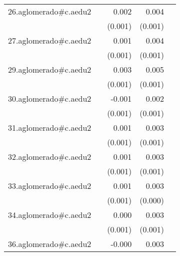 {\begin{longtable}{l*{4}{D{.}{.}{-1}}}
\addlinespace
26.aglomerado#c.aedu2&                     &       0.002         &       0.004\sym{***}&                     \\
            &                     &     (0.001)         &     (0.001)         &                     \\
\addlinespace
27.aglomerado#c.aedu2&                     &       0.001         &       0.004\sym{***}&                     \\
            &                     &     (0.001)         &     (0.001)         &                     \\
\addlinespace
29.aglomerado#c.aedu2&                     &       0.003\sym{*}  &       0.005\sym{***}&                     \\
            &                     &     (0.001)         &     (0.001)         &                     \\
\addlinespace
30.aglomerado#c.aedu2&                     &      -0.001         &       0.002         &                     \\
            &                     &     (0.001)         &     (0.001)         &                     \\
\addlinespace
31.aglomerado#c.aedu2&                     &       0.001         &       0.003\sym{**} &                     \\
            &                     &     (0.001)         &     (0.001)         &                     \\
\addlinespace
32.aglomerado#c.aedu2&                     &       0.001         &       0.003\sym{***}&                     \\
            &                     &     (0.001)         &     (0.001)         &                     \\
\addlinespace
33.aglomerado#c.aedu2&                     &       0.001         &       0.003\sym{***}&                     \\
            &                     &     (0.001)         &     (0.000)         &                     \\
\addlinespace
34.aglomerado#c.aedu2&                     &       0.000         &       0.003\sym{***}&                     \\
            &                     &     (0.001)         &     (0.001)         &                     \\
\addlinespace
36.aglomerado#c.aedu2&                     &      -0.000         &       0.003\sym{**} &                     \\

\end{longtable}}
